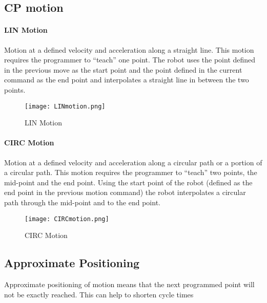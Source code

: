  \subsection{CP motion}
 \paragraph{LIN Motion}
 Motion at a defined velocity and acceleration along a straight line.  This motion requires the programmer to “teach” one point.  The robot uses the point defined in the previous move as the start point and the point defined in the current command as the end point and interpolates a straight line in between the two points.
 \begin{figure}[H]
 	\centering
 	\texttt{[image: LINmotion.png]}
      	\caption{LIN Motion}
 \end{figure}

\paragraph{CIRC Motion}
Motion at a defined velocity and acceleration along a circular path or a portion of a circular path.  This motion requires the programmer to “teach” two points, the mid-point and the end point.  Using the start point of the robot (defined as the end point in the previous motion command) the robot interpolates a circular path through the mid-point and to the end point.
\begin{figure}[H]
	\centering
	\texttt{[image: CIRCmotion.png]}
    	\caption{CIRC Motion}
\end{figure} 

\subsection{Approximate Positioning}
Approximate positioning of motion means that the next programmed point will not be exactly reached. This can help to shorten cycle times

